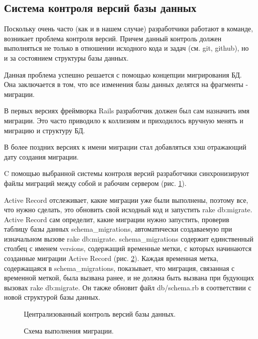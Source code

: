 \subsection{Система контроля версий базы данных}
Поскольку очень часто (как и в нашем случае) разработчики работают в команде,
возникает проблема контроля версий. Причем данный контроль должен выполняться не
только в отношении исходного кода и задач (см. git, github), но и за состоянием
структуры базы данных.

Данная проблема успешно решается с помощью концепции мигрирования БД. Она
заключается в том, что все изменения базы данных делятся на фрагменты -
миграции.

В первых версиях фреймворка Rails разработчик должен был сам назначить имя
миграции. Это часто приводило к коллизиям и приходилось вручную менять и
миграцию и структуру БД.

В более поздних версиях к имени миграции стал добавляться хэш отражающий дату
создания миграции.

C помощью выбранной системы контроля версий разработчики синхронизируют файлы
миграций между собой и рабочим сервером (рис. \ref{ris:development_migrations}).

Active Record отслеживает, какие миграции уже были выполнены, поэтому все, что
нужно сделать, это обновить свой исходный код и запустить rake db:migrate.
Active Record сам определит, какие миграции нужно запустить, проверив таблицу
базы данных schema\_migrations, автоматически создаваемую при изначальном вызове
rake db:migrate. schema\_migrations содержит единственный столбец с именем
versions, содержащий временные метки, с которых начинаются созданные миграции
Active Record (рис. \ref{ris:migration_algorithm}). Каждая временная метка,
содержащаяся в schema\_migrations, показывает, что миграция, связанная с временной меткой, была
вызвана ранее, и не должна быть вызвана при будующих вызовах rake db:migrate. Он
также обновит файл db/schema.rb в соответствии с новой структурой базы данных.

\begin{figure}[h]
\caption{Централизованный контроль версий базы данных.}
\label{ris:development_migrations}
\end{figure}

\begin{figure}[h]
\caption{Схема выполнения миграции.}
\label{ris:migration_algorithm}
\end{figure}

